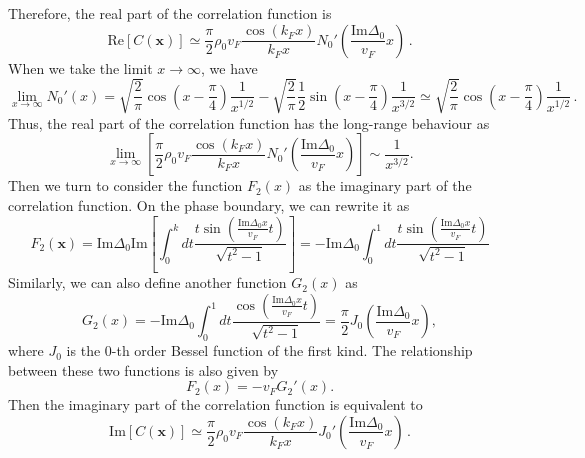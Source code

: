 \documentclass[aps,prl,twocolumn,nofootinbib,superscriptaddress,longbibliography]{revtex4-1}
\begin{document}
Therefore, the real part of the correlation function is
\begin{equation}
	\mathrm{Re}[C(\bm{x})]\simeq\frac{\pi}{2} \rho_0v_F \frac{\cos (k_F x)}{k_Fx} N_0' \left( \frac{\text{Im}
		\Delta_0}{v_F} x \right)\,.
\end{equation}
When we take the limit $x \rightarrow \infty$, we have
\begin{equation}
	\lim_{x \rightarrow \infty} N_0' (x) = \sqrt{\frac{2}{\pi}} \cos \left( x -
	\frac{\pi}{4} \right) \frac{1}{x^{1 / 2}} - \sqrt{\frac{2}{\pi}} \frac{1}{2}
	\sin \left( x - \frac{\pi}{4} \right) \frac{1}{x^{3 / 2}} \simeq 
	\sqrt{\frac{2}{\pi}} \cos \left( x - \frac{\pi}{4} \right) \frac{1}{x^{1 /
			2}}\,.
	\label{Realexact}
\end{equation}
Thus, the real part of the correlation function has the long-range behaviour as
\begin{equation}
	\lim_{x \rightarrow \infty} \left[  \frac{\pi}{2} \rho_0 v_F \frac{\cos (k_F x)}{k_Fx}
	N_0' \left( \frac{\text{Im} \Delta_0}{v_F} x \right) \right] \sim \frac{1}{x^{3 / 2}}.
\end{equation}
Then we turn to consider the function $F_2(x)$ as the imaginary part of the correlation function. On the phase boundary, we can rewrite it as
\begin{equation}
	F_2(\bm{x})=\text{Im}\Delta_0\text{Im}\left[\int_0^{k} dt \frac{t\sin ( \frac{\text{Im}\Delta_0x}{v_F}
	t )}{ \sqrt{t^2 - 1}}\right]=-\text{Im}\Delta_0\int_0^{1} dt \frac{t\sin ( \frac{\text{Im}\Delta_0x}{v_F}
	t )}{ \sqrt{t^2 - 1}}
	\label{definition_of_F2}
\end{equation}
Similarly, we can also define another function $G_2(x)$ as
\begin{equation}
	G_2(x)=-\text{Im}\Delta_0\int_0^{1} dt \frac{\cos ( \frac{\text{Im}\Delta_0x}{v_F}
	t )}{ \sqrt{t^2 - 1}}=\frac{\pi}{2} J_0 \left( \frac{\text{Im}\Delta_0}{v_F} x \right),
\end{equation}
where $J_0$ is the 0-th order Bessel function of the first kind. The relationship between these two functions is also given by
\begin{equation}
	F_2 (x) = - v_F G_2' (x). %
\end{equation}
Then the imaginary part of the correlation function is equivalent to
\begin{equation}
	\mathrm{Im}[C(\bm{x})]\simeq\frac{\pi}{2} \rho_0 v_F\frac{\cos (k_F x)}{k_Fx} J_0' \left( \frac{\text{Im}
		\Delta_0}{v_F} x \right)\,.
\end{equation}
\end{document}
